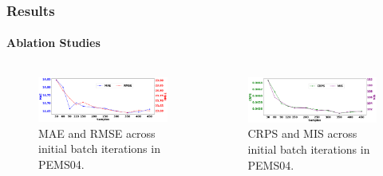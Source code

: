 \documentclass[light]{lutbeamer} %
\begin{document}
\begin{frame}
    \frametitle{Results}
    \framesubtitle{Ablation Studies}

    \begin{columns}
        \begin{column}{0.5\textwidth}
            \begin{figure}
                \centering
                \includegraphics[width=\textwidth]{figures/mae_rmse_samples.png}
                \caption{MAE and RMSE across initial batch iterations in PEMS04.}
            \end{figure}
        \end{column}
        \begin{column}{0.5\textwidth}
            \begin{figure}
                \centering
                \includegraphics[width=\textwidth]{figures/crps_mis_samples.png}
                \caption{CRPS and MIS across initial batch iterations in PEMS04.}
            \end{figure}
        \end{column}
    \end{columns}

\end{frame}
\end{document}
